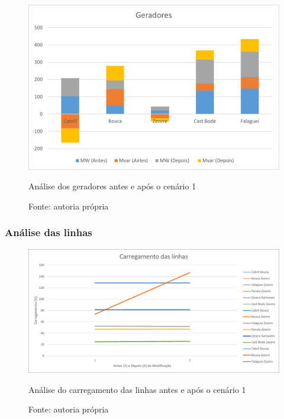 \begin{figure}[H]
	\centering
	\captionsetup{width=\textwidth, font=footnotesize, textfont=bf}	
	\includegraphics[width=\linewidth]{img/geradores_caso1.pdf}
	\caption{Análise dos geradores antes e após o cenário 1}
	\vspace{-3.5mm}
	\caption*{Fonte: autoria própria}
	\label{fig:geradores_caso1}
\end{figure}


\subsubsection{Análise das linhas}

\begin{figure}[H]
	\centering
	\captionsetup{width=\textwidth, font=footnotesize, textfont=bf}	
	\includegraphics[width=0.9\linewidth]{img/carregamento_linhas_caso1.pdf}
	\caption{Análise do carregamento das linhas antes e após o cenário 1}
	\vspace{-3.5mm}
	\caption*{Fonte: autoria própria}
	\label{fig:carregamento_linhas_caso1}
\end{figure}

